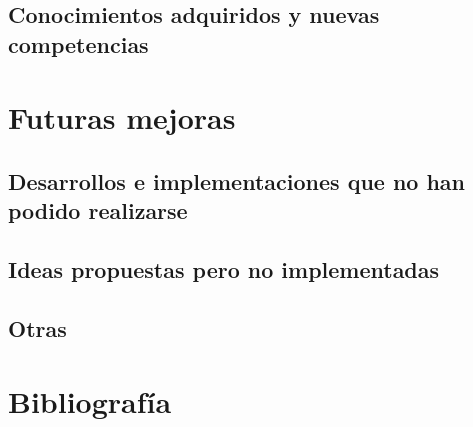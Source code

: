 \section{Conocimientos adquiridos y nuevas competencias}


\chapter{Futuras mejoras}

\section{Desarrollos e implementaciones que no han podido realizarse}

\section{Ideas propuestas pero no implementadas}

\section{Otras}


\chapter*{Bibliografía}


\appendix
